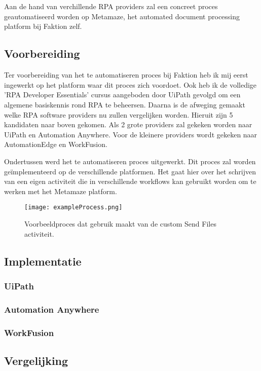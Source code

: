 
\chapter{}
\label{ch:methodologie}


Aan de hand van verchillende RPA providers zal een concreet proces geautomatiseerd worden op Metamaze, het automated document processing platform bij Faktion zelf.


\section{Voorbereiding}
Ter voorbereiding van het te automatiseren proces bij Faktion heb ik mij eerst ingewerkt op het platform waar dit proces zich voordoet. Ook heb ik de volledige 'RPA Developer Essentials' cursus aangeboden door UiPath gevolgd om een algemene basiskennis rond RPA te beheersen. Daarna is de afweging gemaakt welke RPA software providers nu zullen vergelijken worden. Hieruit zijn 5 kandidaten naar boven gekomen. Als 2 grote providers zal gekeken worden naar UiPath en Automation Anywhere. Voor de kleinere providers wordt gekeken naar AutomationEdge en WorkFusion.

Ondertussen werd het te automatiseren proces uitgewerkt. Dit proces zal worden geïmplementeerd op de verschillende  platformen. Het gaat hier over het schrijven van een eigen activiteit die in verschillende workflows kan gebruikt worden om te werken met het Metamaze platform.
\begin{figure}[h]
	\texttt{[image: exampleProcess.png]}
	\caption{Voorbeeldproces dat gebruik maakt van de custom Send Files activiteit.}
\end{figure}

\section{Implementatie}
\subsection{UiPath}
\subsection{Automation Anywhere}
\subsection{WorkFusion}
\section{Vergelijking}
